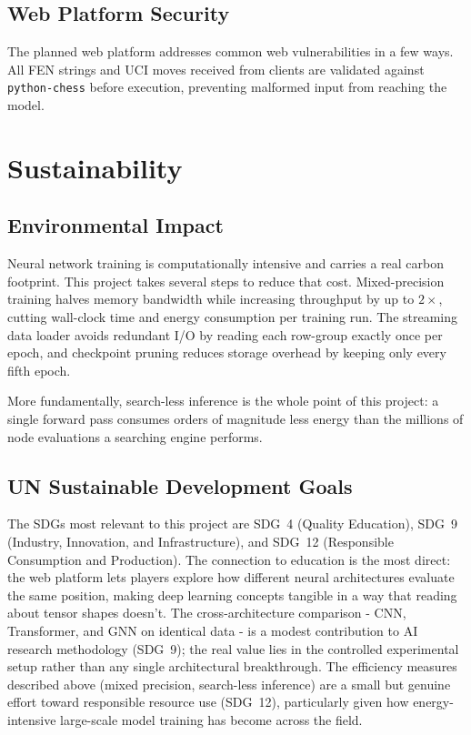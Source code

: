 \subsection{Web Platform Security}
The planned web platform addresses common web vulnerabilities in a few ways. All FEN strings and UCI moves received from clients are validated against \texttt{python-chess} before execution, preventing malformed input from reaching the model.

\section{Sustainability}

\subsection{Environmental Impact}
Neural network training is computationally intensive and carries a real carbon footprint. This project takes several steps to reduce that cost. Mixed-precision training halves memory bandwidth while increasing throughput by up to $2\times$, cutting wall-clock time and energy consumption per training run. The streaming data loader avoids redundant I/O by reading each row-group exactly once per epoch, and checkpoint pruning reduces storage overhead by keeping only every fifth epoch.

More fundamentally, search-less inference is the whole point of this project: a single forward pass consumes orders of magnitude less energy than the millions of node evaluations a searching engine performs.

\subsection{UN Sustainable Development Goals}

The SDGs most relevant to this project are SDG~4 (Quality Education), SDG~9 (Industry, Innovation, and Infrastructure), and SDG~12 (Responsible Consumption and Production). The connection to education is the most direct: the web platform lets players explore how different neural architectures evaluate the same position, making deep learning concepts tangible in a way that reading about tensor shapes doesn't. The cross-architecture comparison - CNN, Transformer, and GNN on identical data - is a modest contribution to AI research methodology (SDG~9); the real value lies in the controlled experimental setup rather than any single architectural breakthrough. The efficiency measures described above (mixed precision, search-less inference) are a small but genuine effort toward responsible resource use (SDG~12), particularly given how energy-intensive large-scale model training has become across the field.

